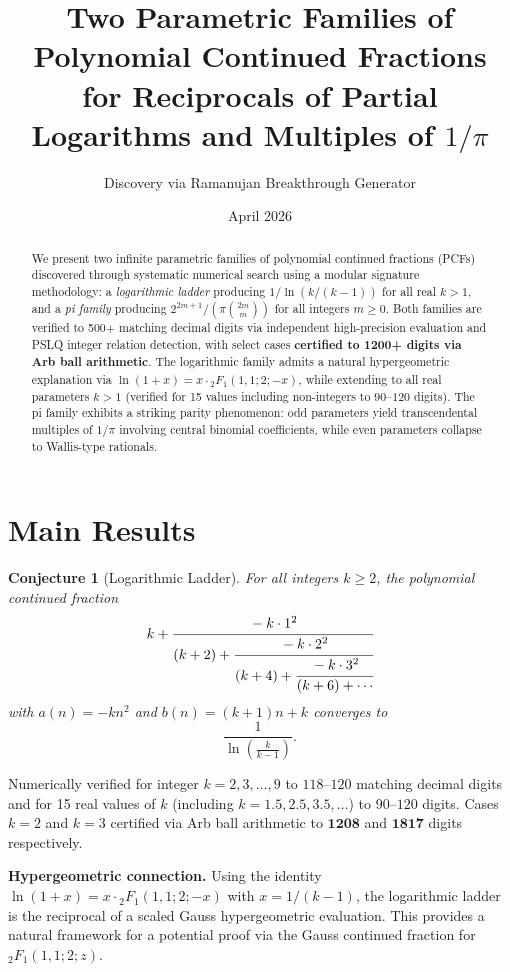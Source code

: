 \documentclass[11pt]{article}
\title{Two Parametric Families of Polynomial Continued Fractions\\
for Reciprocals of Partial Logarithms and Multiples of $1/\pi$}
\author{Discovery via Ramanujan Breakthrough Generator}
\date{April 2026}
\newtheorem{conjecture}{Conjecture}
\begin{document}
\maketitle

\begin{abstract}
We present two infinite parametric families of polynomial continued fractions (PCFs)
discovered through systematic numerical search using a modular signature methodology:
a \emph{logarithmic ladder} producing $1/\ln(k/(k-1))$ for all real $k > 1$,
and a \emph{pi family} producing $2^{2m+1}/(\pi \binom{2m}{m})$ for all integers $m \geq 0$.
Both families are verified to 500+ matching decimal digits via independent
high-precision evaluation and PSLQ integer relation detection, with select cases
\textbf{certified to 1200+ digits via Arb ball arithmetic}.
The logarithmic family admits a natural hypergeometric explanation via
$\ln(1+x) = x \cdot {}_2F_1(1,1;2;-x)$, while extending to all real parameters $k > 1$
(verified for 15 values including non-integers to $90$--$120$ digits).
The pi family exhibits a striking parity phenomenon: odd parameters yield
transcendental multiples of $1/\pi$ involving central binomial coefficients,
while even parameters collapse to Wallis-type rationals.
\end{abstract}

\section{Main Results}

\begin{conjecture}[Logarithmic Ladder]\label{conj:log}
For all integers $k \geq 2$, the polynomial continued fraction
\[
  k + \cfrac{-k \cdot 1^2}{(k+2) + \cfrac{-k \cdot 2^2}{(k+4) + \cfrac{-k \cdot 3^2}{(k+6) + \cdots}}}
\]
with $a(n) = -kn^2$ and $b(n) = (k+1)n + k$ converges to
\[
  \frac{1}{\ln\!\left(\frac{k}{k-1}\right)}.
\]
\end{conjecture}

\noindent Numerically verified for integer $k = 2, 3, \ldots, 9$ to $118$--$120$
matching decimal digits and for 15 real values of $k$ (including $k = 1.5, 2.5, 3.5, \ldots$)
to $90$--$120$ digits. Cases $k = 2$ and $k = 3$ certified via Arb ball
arithmetic to $\mathbf{1208}$ and $\mathbf{1817}$ digits respectively.

\smallskip
\noindent\textbf{Hypergeometric connection.} Using the identity
$\ln(1+x) = x \cdot {}_2F_1(1,1;2;-x)$ with $x = 1/(k-1)$,
the logarithmic ladder is the reciprocal of a scaled Gauss hypergeometric evaluation.
This provides a natural framework for a potential proof via the Gauss continued
fraction for ${}_2F_1(1,1;2;z)$.
\end{document}

